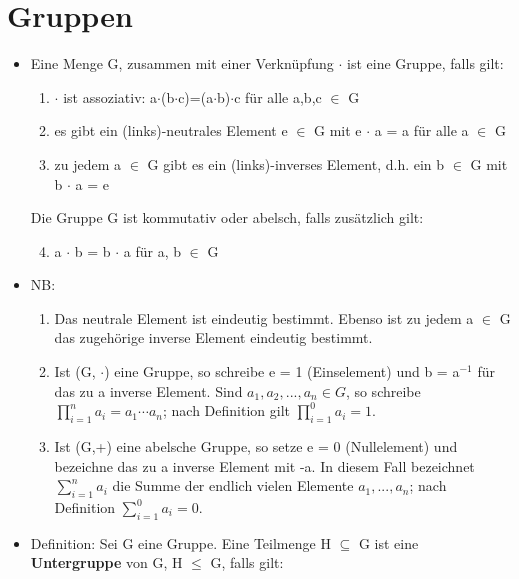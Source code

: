 %


\section{Gruppen}
\begin{itemize}
\item Eine Menge G, zusammen mit einer Verknüpfung $\cdot$ ist eine Gruppe, falls gilt:
\begin{enumerate}
\item $\cdot$ ist assoziativ: a$\cdot$(b$\cdot$c)=(a$\cdot$b)$\cdot$c für alle a,b,c $\in$ G
\item es gibt ein (links)-neutrales Element e $\in$ G mit e $\cdot$ a = a für alle a $\in$ G 
\item zu jedem a $\in$ G gibt es ein (links)-inverses Element, d.h. ein b $\in$ G mit b $\cdot$ a = e
\end{enumerate}
Die Gruppe G ist kommutativ oder abelsch, falls zusätzlich gilt:
\begin{enumerate}
\setcounter{enumi}{3}
\item a $\cdot$ b = b $\cdot$ a für a, b $\in$ G
\end{enumerate}
\item NB: 
\begin{enumerate}
\item Das neutrale Element ist eindeutig bestimmt. Ebenso ist zu jedem a $\in$ G das zugehörige inverse Element eindeutig bestimmt.
\item Ist (G, $\cdot$) eine Gruppe, so schreibe e = 1 (Einselement) und b = a$^{-1}$ für das zu a inverse Element. Sind $a_1, a_2, . . . , a_n \in G$, so schreibe $\prod\nolimits_{i=1}^{n} a_i = a_1 \cdots a_n$; nach Definition gilt $\prod\nolimits_{i=1}^{0}a_i = 1$.
\item Ist (G,+) eine abelsche Gruppe, so setze e = 0 (Nullelement) und bezeichne das zu a inverse Element mit -a. In diesem Fall bezeichnet $\sum\nolimits_{i=1}^{n} a_i$ die Summe der endlich vielen Elemente $a_1, . . . , a_n$; nach Definition $\sum\nolimits_{i=1}^{0} a_i = 0$.
\end{enumerate}
\item Definition: Sei G eine Gruppe. Eine Teilmenge H $\subseteq$ G ist eine \textbf{Untergruppe} von G, H $\le$ G, falls gilt:

\end{itemize}
